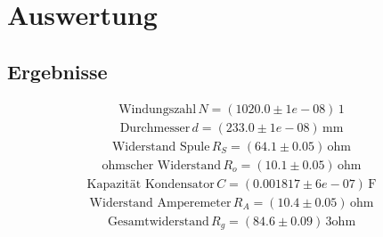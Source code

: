 \documentclass[a4paper,10pt]{scrbook}
\begin{document}
\section*{Auswertung}

\subsection*{Ergebnisse}

\begin{align*}
\text{Windungszahl}\,N = (1020.0\pm 1e-08)\,\mathrm{1}
\end{align*}
\begin{align*}
\text{Durchmesser}\,d = (233.0\pm 1e-08)\,\mathrm{mm}
\end{align*}
\begin{align*}
\text{Widerstand Spule}\,R_S = (64.1\pm 0.05)\,\mathrm{ohm}
\end{align*}
\begin{align*}
\text{ohmscher Widerstand}\,R_o = (10.1\pm 0.05)\,\mathrm{ohm}
\end{align*}
\begin{align*}
\text{Kapazität Kondensator}\,C = (0.001817\pm 6e-07)\,\mathrm{F}
\end{align*}
\begin{align*}
\text{Widerstand Amperemeter}\,R_A = (10.4\pm 0.05)\,\mathrm{ohm}
\end{align*}
\begin{align*}
\text{Gesamtwiderstand}\,R_g = (84.6\pm 0.09)\,\mathrm{3 ohm}
\end{align*}
\end{document}
